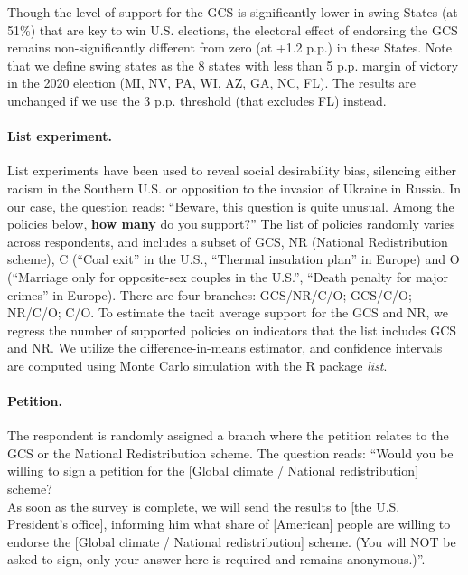 \documentclass[12pt,english]{article}
\begin{document}
\begin{small}
Though the level of support for the GCS is significantly lower in swing States (at 51\%) that are key to win U.S. elections, the electoral effect of endorsing the GCS remains non-significantly different from zero (at +1.2 p.p.) in these States. Note that we define swing states as the 8 states with less than 5 p.p. margin of victory in the 2020 election (MI, NV, PA, WI, AZ, GA, NC, FL). The results are unchanged if we use the 3 p.p. threshold (that excludes FL) instead. 

\paragraph{\small List experiment.} %
List experiments have been used to reveal social desirability bias, silencing either racism in the Southern U.S.\citep{kuklinski_racial_1997} or opposition to the invasion of Ukraine in Russia.\citep{chapkovski_solid_2022} %
In our case, the question reads: ``Beware, this question is quite unusual. Among the policies below, \textbf{how many} do you support?'' The list of policies randomly varies across respondents, and includes a subset of GCS, NR (National Redistribution scheme), C (``Coal exit'' in the U.S., ``Thermal insulation plan'' in Europe) and O (``Marriage only for opposite-sex couples in the U.S.'', ``Death penalty for major crimes'' in Europe). There are four branches: GCS/NR/C/O; GCS/C/O; NR/C/O; C/O. To estimate the tacit average support for the GCS and NR, we regress the number of supported policies on indicators that the list includes GCS and NR.
We utilize the difference-in-means estimator, and confidence intervals are computed using Monte Carlo simulation with the R package \textit{list}.\citep{imai_multivariate_2011}

\paragraph{\small Petition.}
The respondent is randomly assigned a branch where the petition relates to the GCS or the National Redistribution scheme. The question reads: ``Would you be willing to sign a petition for the [Global climate / National redistribution] scheme? \\ As soon as the survey is complete, we will send the results to [the U.S. President's office], informing him what share of [American] people are willing to endorse the [Global climate / National redistribution] scheme. (You will NOT be asked to sign, only your answer here is required and remains anonymous.)''. 


\end{small}
\end{document}

